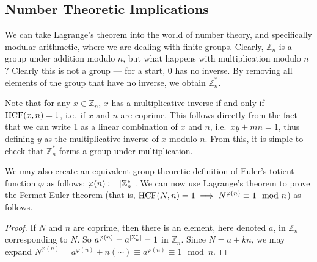 \subsection{Number Theoretic Implications}
We can take Lagrange's theorem into the world of number theory, and specifically modular arithmetic, where we are dealing with finite groups.
Clearly, \(\mathbb Z_n\) is a group under addition modulo \(n\), but what happens with multiplication modulo \(n\)?
Clearly this is not a group --- for a start, 0 has no inverse.
By removing all elements of the group that have no inverse, we obtain \(\mathbb Z_n^*\).

Note that for any \(x \in \mathbb Z_n\), \(x\) has a multiplicative inverse if and only if \(\operatorname{HCF}(x, n) = 1\), i.e.\ if \(x\) and \(n\) are coprime.
This follows directly from the fact that we can write 1 as a linear combination of \(x\) and \(n\), i.e.\ \(xy + mn = 1\), thus defining \(y\) as the multiplicative inverse of \(x\) modulo \(n\).
From this, it is simple to check that \(\mathbb Z_n^*\) forms a group under multiplication.

We may also create an equivalent group-theoretic definition of Euler's totient function \(\varphi\) as follows: \(\varphi(n) := \abs{\mathbb Z_n^*}\).
We can now use Lagrange's theorem to prove the Fermat-Euler theorem (that is, \(\operatorname{HCF}(N, n) = 1 \implies N^{\varphi(n)} \equiv 1 \mod n\)) as follows.
\begin{proof}
	If \(N\) and \(n\) are coprime, then there is an element, here denoted \(a\), in \(\mathbb Z_n\) corresponding to \(N\).
	So \(a^{\varphi(n)} = a^{\abs{\mathbb Z_n^*}} = 1\) in \(\mathbb Z_n\).
	Since \(N = a + kn\), we may expand \(N^{\varphi(n)} = a^{\varphi(n)} + n(\cdots) \equiv a^{\varphi(n)} \equiv 1 \mod n\).
\end{proof}
